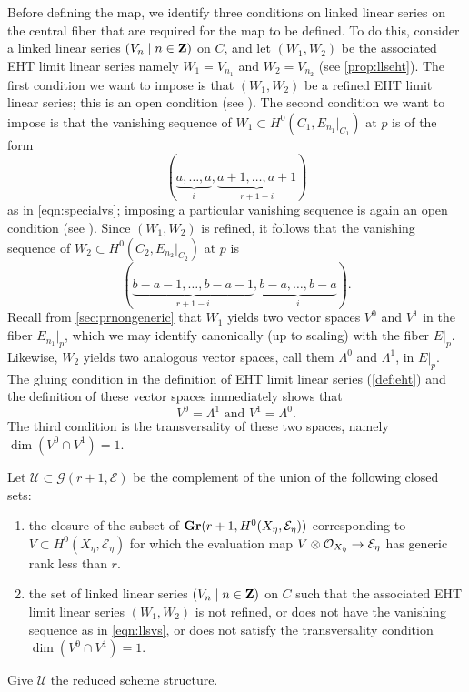 Before defining the map, we identify three conditions on linked linear series on the central fiber that are required for the map to be defined.
To do this, consider a linked linear series $(V_n \mid n \in {\bf Z})$ on $C$, and let $(W_1, W_2)$ be the associated EHT limit linear series namely $W_1 = V_{n_1}$ and $W_2 = V_{n_2}$ (see \autoref{prop:llseht}).
The first condition we want to impose is that $(W_1, W_2)$ be a refined EHT limit linear series; this is an open condition (see \cite[Proposition~4.1.5]{oss:14}).
The second condition we want to impose is that the vanishing sequence of $W_1 \subset H^0(C_1, E_{n_1}|_{C_1})$ at $p$ is of the form
\begin{equation}\label{eqn:llsvs}
  (\underbrace{a, \dots, a}_i, \underbrace{a+1, \dots, a+1}_{r+1-i})
\end{equation}
as in \eqref{eqn:specialvs}; imposing a particular vanishing sequence is again an open condition (see \cite[Proposition~4.2.5]{oss:14}).
Since $(W_1, W_2)$ is refined, it follows that the vanishing sequence of $W_2 \subset H^0(C_2, E_{n_2}|_{C_2})$ at $p$ is
\[ (\underbrace{b-a-1, \dots, b-a-1}_{r+1-i}, \underbrace{b-a, \dots, b-a}_{i}).\]
Recall from \autoref{sec:prnongeneric} that $W_1$ yields two vector spaces $V^0$ and $V^1$ in the fiber $E_{n_1}|_p$, which we may identify canonically (up to scaling) with the fiber $E|_p$.
Likewise, $W_2$ yields two analogous vector spaces, call them $\Lambda^0$ and $\Lambda^1$, in $E|_p$.
The gluing condition in the definition of EHT limit linear series (\autoref{def:eht}) and the definition of these vector spaces immediately shows that
\begin{equation}\label{eqn:vlambdaswitch}
  V^0 = \Lambda^1 \text{ and } V^1 = \Lambda^0.
\end{equation}
The third condition is the transversality of these two spaces, namely $\dim (V^0 \cap V^1) = 1$.

Let $\mathcal U \subset {\mathcal G}(r+1, \mathcal E)$ be the complement of the union of the following closed sets:
\begin{enumerate}
\item the closure of the subset of ${\bf Gr}(r+1, H^0(X_\eta, \mathcal E_\eta))$ corresponding to $V \subset H^0(X_\eta, \mathcal E_\eta)$ for which the evaluation map $V\otimes\mathcal O_{X_\eta} \to \mathcal E_\eta$ has generic rank less than $r$.
\item the set of linked linear series $(V_n \mid n \in {\bf Z})$ on $C$ such that the associated EHT limit linear series $(W_1, W_2)$ is not refined, or does not have the vanishing sequence as in \eqref{eqn:llsvs}, or does not satisfy the transversality condition $\dim (V^0 \cap V^1) = 1$.
\end{enumerate}
Give $\mathcal U$ the reduced scheme structure.

